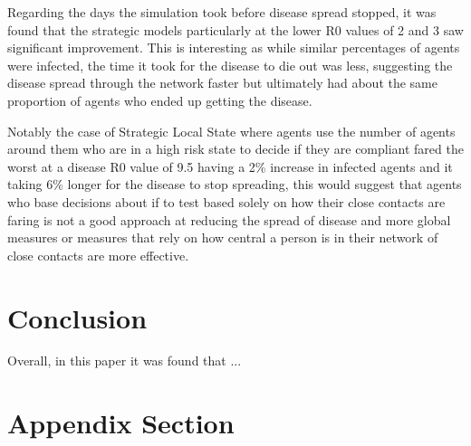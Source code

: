 \documentclass{article}
\begin{document}
Regarding the days the simulation took before disease spread stopped, it was found that the strategic models particularly at the lower R0 values of 2 and 3 saw significant improvement. This is interesting as while similar percentages of agents were infected, the time it took for the disease to die out was less, suggesting the disease spread through the network faster but ultimately had about the same proportion of agents who ended up getting the disease.

Notably the case of Strategic Local State where agents use the number of agents around them who are in a high risk state to decide if they are compliant fared the worst at a disease R0 value of 9.5 having a 2\% increase in infected agents and it taking 6\% longer for the disease to stop spreading, this would suggest that agents who base decisions about if to test based solely on how their close contacts are faring is not a good approach at reducing the spread of disease and more global measures or measures that rely on how central a person is in their network of close contacts are more effective. 


\section{Conclusion}
Overall, in this paper it was found that ...




\newpage
\appendix

\section{Appendix Section}


{}

\end{document}
